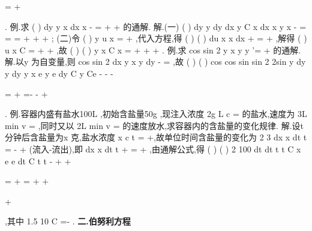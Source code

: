 \int 
\int 
=
+




\int 
. 
\textcolor{lyred}{例}.求
(
)
dy
y
x
dx
x
-
=
+
+
的通解. 
解.(一)
(
)
dy
y
dy
dx
y
C x
dx
x
y
x
-
=
\Rightarrow 
=
\Rightarrow 
=
+
+
+
; 
(二)令
(
)
y
u x
=
+
,代入方程,得
(
)
(
)
du
x
x
dx \cdots 
+
=
+
,解得
(
)
u
x
C
=
+
+
,故 
(
)
(
)
y
x
C x
=
+
+
+
. 
\textcolor{lyred}{例}.求
cos
sin 2
y
x
y
y
'=
+
的通解. 
解.以y 为自变量,则
cos
sin 2
dx
y x
y
dy -
\cdots 
=
,故 
(
)
(
)
cos
cos
sin
sin 2
2sin
y dy
y dy
y
x
e
y e
dy
C
y
Ce
-
-
-


\int 
\int 
=
\cdots 
+
=-
-
+




\int 
. 
\textcolor{lyred}{例}.容器内盛有盐水100L ,初始含盐量50g ,现注入浓度
2g L
c =
的盐水,速度为 
3L min
v =
,同时又以
2L min
v =
的速度放水,求容器内的含盐量的变化规律. 
解.设t 分钟后含盐量为x 克,盐水浓度
x
c
t
=
+,故单位时间含盐量的变化为 
2 3
dx
x
dt
t
=
\cdots -
\cdots 
+
(流入-流出),即
dx
x
dt
t
+
=
+
,由通解公式,得 
(
)
(
)
2 100
dt
dt
t
t
C
x
e
e
dt
C
t
t
-
+
+


\int 
\int 
=
\cdots 
+
=
+
+


+


\int 
,其中
1.5 10
C =-
\times 
. 
\vspace{4pt}
{\bfseries \textcolor{lyred}{二.伯努利方程}}

